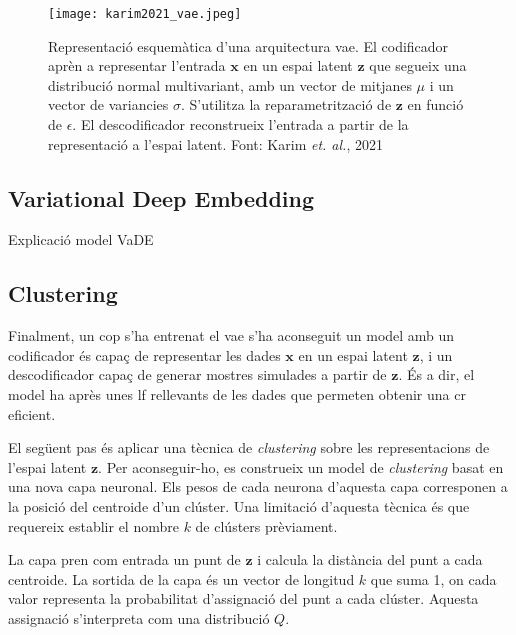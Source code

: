 \documentclass[CAT,BIB]{TFUOC}%
\newcommand{\todo}[1]{
            \begin{tcolorbox}[title=ToDo!, colback=red!5!white, colframe=red!50!black, coltext=red!50!black]
            #1
            \end{tcolorbox}}
\begin{document}
        \begin{figure}
            \centering
            \texttt{[image: karim2021\_vae.jpeg]}
            \caption[\textit{Variational autoencoder}: arquitectura]{
                Representació esquemàtica d'una arquitectura \gls{vae}.
                El codificador aprèn a representar l'entrada $\mathbf{x}$
                en un espai latent $\mathbf{z}$
                que segueix una distribució normal multivariant,
                amb un vector de mitjanes $\mu$ i un vector de variancies $\sigma$.
                S'utilitza la reparametrització de $\mathbf{z}$ en funció de $\epsilon$.
                El descodificador reconstrueix l'entrada
                a partir de la representació a l'espai latent.
                Font: Karim \textit{et. al.}, 2021 \citep{Karim2021}
            }
            \label{fig:vae_min}
        \end{figure}

    \subsection{Variational Deep Embedding}
    \label{s:metodes_vade}

\todo{Explicació model VaDE}


    \subsection{Clustering}
    \label{s:clustering}

        Finalment, un cop s'ha entrenat el \gls{vae}
        s'ha aconseguit un model amb un codificador
        és capaç de representar les dades $\mathbf{x}$ en un espai latent $\mathbf{z}$,
        i un descodificador capaç de generar mostres simulades
        a partir de $\mathbf{z}$.
        És a dir, el model ha après unes \gls{lf} rellevants de les dades
        que permeten obtenir una \gls{cr} eficient.

        El següent pas és aplicar una tècnica de \textit{clustering}
        sobre les representacions de l'espai latent $\mathbf{z}$.
        Per aconseguir-ho,
        es construeix un model de \textit{clustering}
        basat en una nova capa neuronal.
        Els pesos de cada neurona d'aquesta capa
        corresponen a la posició del centroide d'un clúster.
        Una limitació d'aquesta tècnica és que requereix
        establir el nombre $k$ de clústers prèviament.

        La capa pren com entrada un punt de $\mathbf{z}$
        i calcula la distància del punt a cada centroide.
        La sortida de la capa és un vector de longitud $k$ que suma 1,
        on cada valor representa la probabilitat d'assignació del punt a cada clúster.
        Aquesta assignació s'interpreta com una distribució $Q$.
\end{document}
